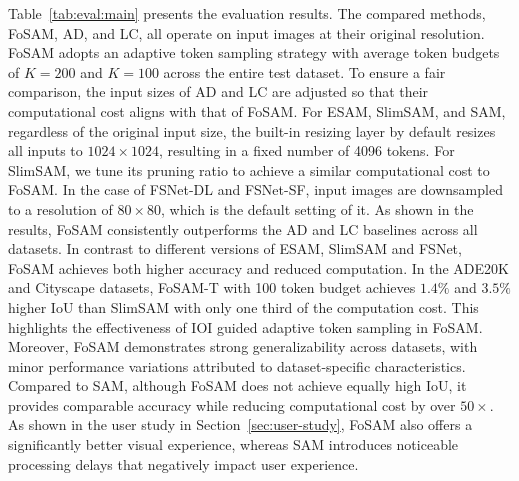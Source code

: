 \documentclass{article}
\begin{document}
Table~\ref{tab:eval:main} presents the evaluation results. The compared methods, FoSAM, AD, and LC, all operate on input images at their original resolution. FoSAM adopts an adaptive token sampling strategy with average token budgets of $K = 200$ and $K = 100$ across the entire test dataset. To ensure a fair comparison, the input sizes of AD and LC are adjusted so that their computational cost aligns with that of FoSAM. For ESAM, SlimSAM, and SAM, regardless of the original input size, the built-in resizing layer by default resizes all inputs to $1024 \times 1024$, resulting in a fixed number of 4096 tokens. For SlimSAM, we tune its pruning ratio to achieve a similar computational cost to FoSAM. In the case of FSNet-DL and FSNet-SF, input images are downsampled to a resolution of $80 \times 80$, which is the default setting of it. As shown in the results, FoSAM consistently outperforms the AD and LC baselines across all datasets. In contrast to different versions of ESAM, SlimSAM and FSNet, FoSAM achieves both higher accuracy and reduced computation. In the ADE20K and Cityscape datasets, FoSAM-T with 100 token budget achieves $1.4\%$ and  $3.5\%$ higher IoU than SlimSAM with only one third of the computation cost. This highlights the effectiveness of IOI guided adaptive token sampling in FoSAM. Moreover, FoSAM demonstrates strong generalizability across datasets, with minor performance variations attributed to dataset-specific characteristics. Compared to SAM, although FoSAM does not achieve equally high IoU, it provides comparable accuracy while reducing computational cost by over $50\times$. As shown in the user study in Section~\ref{sec:user-study}, FoSAM also offers a significantly better visual experience, whereas SAM introduces noticeable processing delays that negatively impact user experience.
\end{document}
